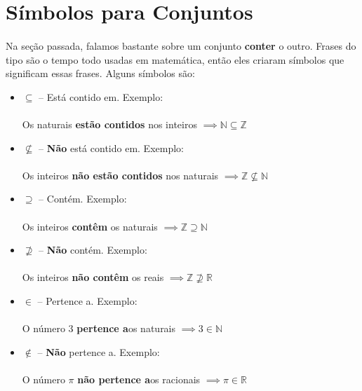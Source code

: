 \documentclass[11pt]{article}
\begin{document}
\newpage

\section{Símbolos para Conjuntos}
\paragraph{}
Na seção passada, falamos bastante sobre um conjunto \textbf{conter} o outro.
Frases do tipo são o tempo todo usadas em matemática, então eles criaram 
símbolos que significam essas frases. Alguns símbolos são:

\begin{itemize}
	\item $\subseteq$ -- Está contido em. Exemplo:
	      \paragraph{}
		  Os naturais \textbf{estão contidos} nos inteiros 
		  $\implies \mathbb{N} \subseteq \mathbb{Z}$

	\item $\not\subseteq$ -- \textbf{Não} está contido em. Exemplo:
	      \paragraph{}
		  Os inteiros \textbf{não estão contidos} nos naturais 
		  $\implies \mathbb{Z} \not\subseteq \mathbb{N}$

	\item $\supseteq$ -- Contém. Exemplo:
	      \paragraph{}
		  Os inteiros \textbf{contêm} os naturais
		  $\implies \mathbb{Z} \supseteq \mathbb{N}$

	\item $\not\supseteq$ -- \textbf{Não} contém. Exemplo:
	      \paragraph{}
		  Os inteiros \textbf{não contêm} os reais
		  $\implies \mathbb{Z} \not\supseteq \mathbb{R}$

	\item $\in$ -- Pertence a. Exemplo: 
		  \paragraph{}
		   O número 3 \textbf{pertence a}os naturais 
		   $\implies 3 \in \mathbb{N}$
	
	\item $\not\in$ -- \textbf{Não} pertence a. Exemplo: 
		  \paragraph{}
		   O número $\pi$ \textbf{não pertence a}os racionais 
		   $\implies \pi \in \mathbb{R}$
\end{itemize}
\end{document}
